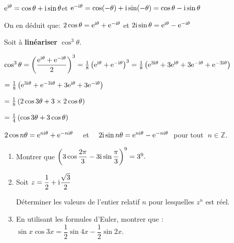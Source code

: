 \medskip

$\mathrm{e}^{\text{i}\theta}=\cos \theta +\text{i}\sin \theta  $\quad  et\quad
 $\mathrm{e}^{-\text{i}\theta}=\cos(-\theta) +\text{i}\sin(- \theta)=\cos \theta -\text{i}\sin \theta $ 


\medskip

On en déduit que: \quad $ 2\cos \theta=\mathrm{e}^{\text{i}\theta}+\mathrm{e}^{-\text{i}\theta} $ \quad  et \quad $ 2\text{i}\sin \theta=\mathrm{e}^{\text{i}\theta}-\mathrm{e}^{-\text{i}\theta} $
\begin{example}
Soit à \textbf{linéariser} $ \cos^3\theta $.
\medskip

$ \cos^3\theta =\left( \dfrac{\mathrm{e}^{\text{i}\theta}+\mathrm{e}^{-\text{i}\theta}}{2}\right)^3=\frac{1}{8}\left(\mathrm{e}^{\text{i}\theta}+\mathrm{e}^{-\text{i}\theta} \right)^3=\frac{1}{8}\left(\mathrm{e}^{3\text{i}\theta}+3\mathrm{e}^{\text{i}\theta}+3\mathrm{e}^{-\text{i}\theta} +\mathrm{e}^{-3\text{i}\theta}\right)$

\medskip

 $ =\frac{1}{8}\left(\mathrm{e}^{3\text{i}\theta}+\mathrm{e}^{-3\text{i}\theta}+3\mathrm{e}^{\text{i}\theta}+3\mathrm{e}^{-\text{i}\theta}\right) $


\medskip

$ =\frac{1}{8}\left(2\cos 3\theta+3\times 2\cos \theta\right) $

 $ =\frac{1}{4}\left(\cos 3\theta+3\cos \theta\right) $
\end{example}

\begin{corollary}
 $ 2\cos n\theta=\mathrm{e}^{n\text{i}\theta}+\mathrm{e}^{-n\text{i}\theta} \quad $  et $\quad  2\text{i}\sin n \theta=\mathrm{e}^{n \text{i}\theta}-\mathrm{e}^{-n \text{i}\theta} \; $  pour tout $ \; n\in\mathbb{Z} $.
\end{corollary}

\begin{exercice}
\begin{enumerate}
\item  Montrer que \; $ \left( 3\cos\dfrac{2\pi}{3} -3\text{i}\sin\dfrac{\pi}{3} \right)^9=3^9. $
\item  Soit $ z=\dfrac{1}{2} +\text{i}\dfrac{\sqrt{3}}{2}$

Déterminer les valeurs de l'entier relatif $ n $ pour lesquelles $ z^n $ est réel.
\item 
En utilisant les formules d'Euler, montrer que : $ \sin x\cos3 x=\dfrac{1}{2} \sin 4x -\dfrac{1}{2} \sin 2x$.
\end{enumerate}
\end{exercice}

